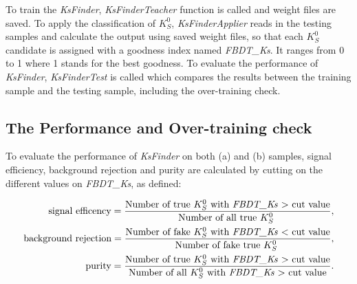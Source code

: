 To train the \textit{KsFinder}, \textit{KsFinderTeacher} function is called and weight files are saved. To apply the classification of $K_S^0$, \textit{KsFinderApplier} reads in the testing samples and calculate the output using saved weight files, so that each $K_S^0$ candidate is assigned with a goodness index named \textit{FBDT\_Ks}. It ranges from 0 to 1 where 1 stands for the best goodness. To evaluate the performance of \textit{KsFinder}, \textit{KsFinderTest} is called which compares the results between the training sample and the testing sample, including the over-training check. 

\subsection{The Performance and Over-training check}
To evaluate the performance of \textit{KsFinder} on both (a) and (b) samples, signal efficiency, background rejection and purity are calculated by cutting on the different values on \textit{FBDT\_Ks}, as defined:

\begin{comment}
\begin{table}
\small
\begin{tabular}{c|c|c|c} 
\hline
Cuts &  Efficiency & purity & BKG rejection\\
\hline
Belle(default): nb\_vlike $>0.5$ \& nb\_nolam $> -0.4$ & 90\% & 95\% & 95\% \\
Belle(optimized): nb\_vlike $>$ 0.2 & 93\% & 95\% & 94\% \\
Belle II extra cut:cosVe $>$ 0.9 & 96\% & 82\% & 80\% \\
Belle II extra cut:cosVe$>$ 0.9 \& signi $>10$ & 94\% & 88\% & 87\% \\
\textcolor{red}{Belle II extra cut: FBDT\_Ks $>$ 0.74} & \textcolor{red}{95\%} & \textcolor{red}{97\%}  & \textcolor{red}{97\%} \\
\hline
\end{tabular}
\caption{\tiny Summarized performance on $K_S^0$ reconstruction. (The higher is better.)}
\end{table}
\end{comment}




\begin{eqnarray}
	\text{signal efficency} = \frac{\text{Number of true $K_S^0$ with \textit{FBDT\_Ks} $>$ cut value}}{\text{Number of all true $K_S^0$ }}, \label{eq:ks_eff}\\
	\text{background rejection} = \frac{\text{Number of fake $K_S^0$ with  \textit{FBDT\_Ks} $<$ cut value}}{\text{Number of fake true $K_S^0$ }}, \label{eq:ks_rej}\\
	\text{purity} = \frac{\text{Number of true $K_S^0$ with \textit{FBDT\_Ks} $>$ cut value}}{\text{Number of all  $K_S^0$ with \textit{FBDT\_Ks} $>$ cut value}}. \label{eq:ks_purity}
\end{eqnarray}

